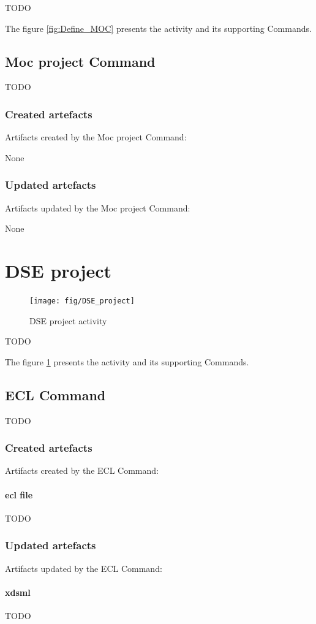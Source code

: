 \documentclass{gemoc} %
\begin{document}
TODO

The figure \ref{fig:Define_MOC} presents the activity and its supporting Commands.

\subsection{Moc project Command}
TODO
\subsubsection{Created artefacts}
Artifacts created by the Moc project Command:

	None
\subsubsection{Updated artefacts}
Artifacts updated by the Moc project Command:

	None

\section{DSE project}
\label{sec:DSE_project}
\begin{figure}[h!]
		\center
		\texttt{[image: fig/DSE\_project]}
		\caption{DSE project activity}
		\label{fig:DSE_project}
\end{figure}

TODO

The figure \ref{fig:DSE_project} presents the activity and its supporting Commands.

\subsection{ECL Command}
TODO
\subsubsection{Created artefacts}
Artifacts created by the ECL Command:
\paragraph{ecl file} 
TODO
\subsubsection{Updated artefacts}
Artifacts updated by the ECL Command:
\paragraph{xdsml} 
TODO
\end{document}
